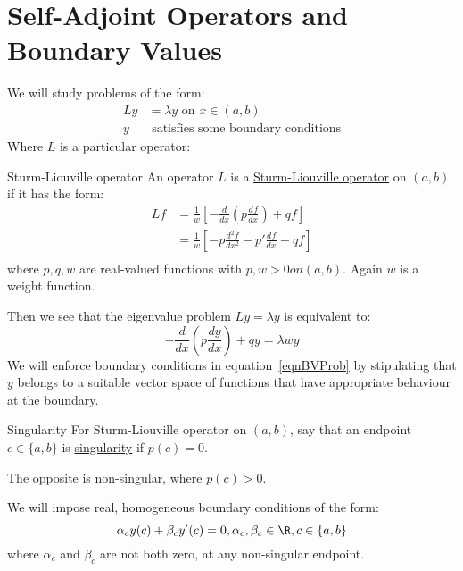 \documentclass[../Main.tex]{subfiles}
\begin{document}
\section{Self-Adjoint Operators and Boundary Values}
We will study problems of the form:
\begin{align}
    Ly &= \lambda y \text{ on } x\in(a, b) \label{eqnBVProb} \\
    y &\text{ satisfies some boundary conditions} \nonumber
\end{align}
Where $L$ is a particular operator:
\begin{definition}{Sturm-Liouville operator}
    An operator $L$ is a \underline{Sturm-Liouville operator} on $(a, b)$ if it has the form:
    \begin{align*}
        Lf &= \frac{1}{w}\left[-\frac{d}{dx}\left(p \frac{d^{}f}{dx^{}}\right) + qf\right] \\
        &= \frac{1}{w}\left[-p \frac{d^{2}f}{dx^{2}} - p' \frac{d^{}f}{dx^{}} + qf\right] \\
    \end{align*}
    where $p, q, w$ are real-valued functions with $p, w > 0 on (a, b)$. Again $w$ is a weight function.
\end{definition}
Then we see that the eigenvalue problem $Ly = \lambda y$ is equivalent to:
\begin{equation}
    -\frac{d}{dx}\left(p \frac{dy}{dx}\right) + qy = \lambda w y
    \label{eqnSLProb}
\end{equation}
We will enforce boundary conditions in equation~\ref{eqnBVProb} by stipulating that $y$ belongs to a suitable vector space of functions that have appropriate behaviour at the boundary.
\begin{definition}{Singularity}
    For Sturm-Liouville operator on $(a, b)$, say that an endpoint $c \in \{a, b\}$ is \underline{singularity} if $p(c) = 0$.

    The opposite is non-singular, where $p(c) > 0$.
\end{definition}
We will impose real, homogeneous boundary conditions of the form:
\begin{equation}
    \alpha_c y(c) + \beta_c y'(c) = 0, \alpha_c, \beta_c \in \R, c \in \{a, b\}
    \label{eqnBoundaryCondition}
\end{equation}
where $\alpha_c$ and $\beta_c$ are not both zero, at any non-singular endpoint.
\end{document}
